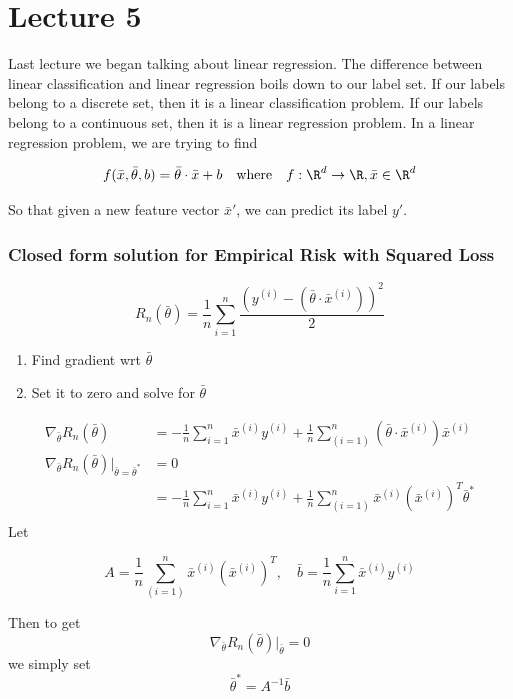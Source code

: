 \documentclass[12pt]{article}
\begin{document}
\newpage

\part{Lecture 5}

Last lecture we began talking about linear regression. The difference between linear classification and linear regression boils down to our label set. If our labels belong to a discrete set, then it is a linear classification problem. If our labels belong to a continuous set, then it is a linear regression problem. In a linear regression problem, we are trying to find 

\[ f(\bar x, \bar{\theta}, b) = \bar{\theta} \cdot \bar x + b \quad \text{where} \quad f: \R^d \rightarrow \R, \bar x \in \R^d\]


So that given a new feature vector $\bar{x}'$, we can predict its label $y'$.

\section{Closed form solution for Empirical Risk with Squared Loss}
\[ R_n(\bar{\theta}) = \frac 1 n \sum_{i=1}^n \frac {(y^{(i)} - (\bar{\theta} \cdot \bar{x}^{(i)}))^2} 2 \]

\begin{enumerate}
	\item Find gradient wrt $\bar {\theta}$
	\item Set it to zero and solve for $\bar{\theta}$
\end{enumerate}

\[
	\begin{aligned}
		\nabla_{\bar{\theta}} R_n(\bar{\theta}) &= -\frac 1 n \sum_{i=1}^n \bar{x}^{(i)}y^{(i)} + \frac 1 n \sum_{(i=1)}^n (\bar{\theta} \cdot \bar{x} ^{(i)}) \bar{x}^{(i)}\\
		\nabla_{\bar{\theta}} R_n(\bar{\theta}) |_{\bar{\theta} = \bar{\theta}^*} &= 0\\
																																						 &= -\frac 1 n \sum_{i=1}^n \bar{x}^{(i)}y^{(i)} + \frac 1 n \sum_{(i=1)}^n \bar{x} ^{(i)} (\bar{x}^{(i)})^T \bar{\theta}^* \\
	\end{aligned}
\]
Let

\[ A = \frac 1 n \sum_{(i=1)}^n \bar{x} ^{(i)} (\bar{x}^{(i)})^T, \quad \bar{b} = \frac 1 n \sum_{i=1}^n \bar{x}^{(i)}y^{(i)} \]

Then to get 
\[ \nabla_{\bar{\theta}} R_n(\bar{\theta}) |_{\bar{\theta}} = 0 \]
we simply set
\[ \bar{\theta}^* = A^{-1}\bar{b} \]
\end{document}
